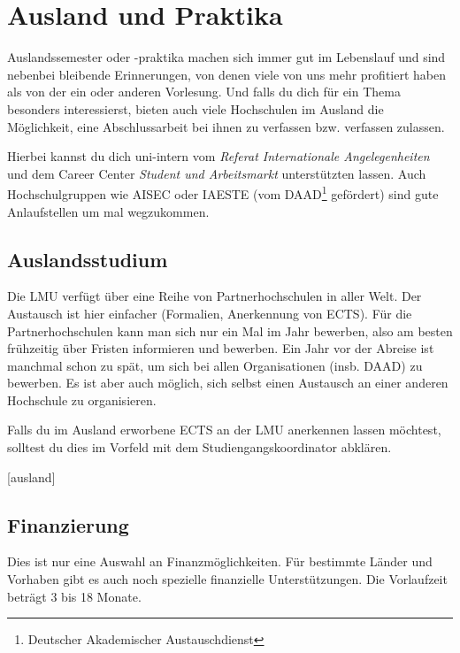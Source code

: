 ﻿\chapter{Ausland und Praktika}

Auslandssemester oder -praktika machen sich immer gut im Lebenslauf
und sind nebenbei bleibende Erinnerungen, von denen viele von uns mehr
profitiert haben als von der ein oder anderen Vorlesung. Und falls du
dich für ein Thema besonders interessierst, bieten auch viele
Hochschulen im Ausland die Möglichkeit, eine Abschlussarbeit bei ihnen
zu verfassen bzw. verfassen zulassen.

Hierbei kannst du dich uni-intern vom \emph{Referat Internationale Angelegenheiten} und dem Career Center \emph{Student und Arbeitsmarkt} unterstützten lassen.
Auch Hochschulgruppen wie AISEC oder IAESTE (vom DAAD\footnote{Deutscher Akademischer Austauschdienst} gefördert) sind gute Anlaufstellen um mal wegzukommen.

\section{Auslandsstudium}

Die LMU verfügt über eine Reihe von Partnerhochschulen in aller
Welt. Der Austausch ist hier einfacher (Formalien, Anerkennung von
ECTS). Für die
Partnerhochschulen kann man sich nur ein Mal im Jahr bewerben, also am
besten frühzeitig über Fristen informieren und bewerben.
Ein Jahr vor der Abreise ist manchmal schon zu spät, um sich bei
allen Organisationen (insb. DAAD) zu bewerben.
Es ist aber auch möglich, sich selbst einen Austausch an einer anderen
Hochschule zu organisieren.

Falls du im Ausland erworbene ECTS an der LMU anerkennen lassen
möchtest, solltest du dies im Vorfeld mit dem Studiengangskoordinator
abklären.


\begin{urlList}
	[ausland]
\end{urlList}

\section{Finanzierung}

Dies ist nur eine Auswahl an Finanzmöglichkeiten. Für bestimmte Länder und
Vorhaben gibt es auch noch spezielle finanzielle Unterstützungen. Die
Vorlaufzeit beträgt 3 bis 18 Monate.

